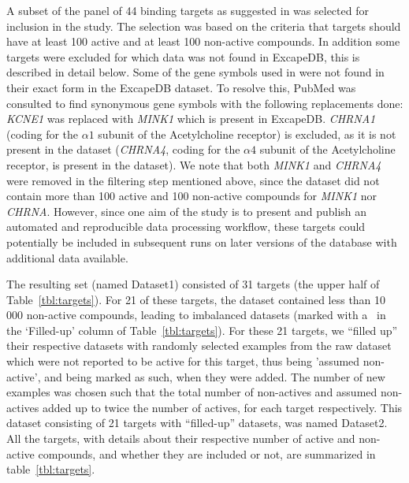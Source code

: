 \documentclass[10pt,article]{memoir}
\begin{document}
A subset of the panel of 44 binding targets as suggested in \cite{Bowes2012}
was selected for inclusion in the study. The selection was based on the
criteria that targets should have at least 100 active and at least 100
non-active compounds.  In addition some targets were excluded for which data
was not found in ExcapeDB, this is described in detail below.
%
Some of the gene symbols used in \cite{Bowes2012} were not found in their exact
form in the ExcapeDB dataset. To resolve this, PubMed was consulted to find
synonymous gene symbols with the following replacements done:
%
\textit{KCNE1} was replaced with \textit{MINK1} which is present in ExcapeDB.
\textit{CHRNA1} (coding for the $\alpha1$ subunit of the Acetylcholine
receptor) is excluded, as it is not present in the dataset (\textit{CHRNA4},
coding for the $\alpha4$ subunit of the Acetylcholine receptor, is present in
the dataset). We note that both \textit{MINK1} and \textit{CHRNA4} were removed
in the filtering step mentioned above, since the dataset did not contain more
than 100 active and 100 non-active compounds for \textit{MINK1} nor
\textit{CHRNA}.  However, since one aim of the study is to present and publish
an automated and reproducible data processing workflow, these targets could
potentially be included in subsequent runs on later versions of the database
with additional data available.

The resulting set (named Dataset1) consisted of 31 targets (the upper half of
Table~\ref{tbl:targets}).  For 21 of these targets, the dataset contained less
than 10\,000 non-active compounds, leading to imbalanced datasets (marked with
a \checkmark\ in the `Filled-up' column of Table~\ref{tbl:targets}).
%
For these 21 targets, we ``filled up'' their respective datasets with randomly
selected examples from the raw dataset which were not reported to be active for
this target, thus being 'assumed non-active', and being marked as such, when
they were added. The number of new examples was chosen such that the total
number of non-actives and assumed non-actives added up to twice the number of
actives, for each target respectively. This dataset consisting of 21 targets
with ``filled-up'' datasets, was named Dataset2.
%
All the targets, with details about their respective number of active and
non-active compounds, and whether they are included or not, are summarized in
table~\ref{tbl:targets}.
\end{document}
